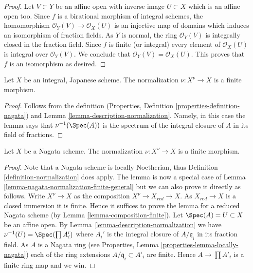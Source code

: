 \begin{proof}
Let $V \subset Y$ be an affine open
with inverse image $U \subset X$ which is an affine open too.
Since $f$ is a birational morphism of integral schemes, the homomorphism
$\mathcal{O}_Y(V) \to \mathcal{O}_X(U)$ is an injective map of domains
which induces an isomorphism of fraction fields. As $Y$ is normal,
the ring $\mathcal{O}_Y(V)$ is integrally closed in the fraction field.
Since $f$ is finite (or integral) every element of $\mathcal{O}_X(U)$
is integral over $\mathcal{O}_Y(V)$. We conclude that
$\mathcal{O}_Y(V) = \mathcal{O}_X(U)$. This proves that $f$ is an
isomorphism as desired.
\end{proof}

\begin{lemma}
\label{lemma-Japanese-normalization}
Let $X$ be an integral, Japanese scheme.
The normalization $\nu : X^\nu \to X$ is a finite morphism.
\end{lemma}

\begin{proof}
Follows from the definition
(Properties, Definition \ref{properties-definition-nagata}) and
Lemma \ref{lemma-description-normalization}. Namely, in this case
the lemma says that $\nu^{-1}(\Spec(A))$ is the spectrum
of the integral closure of $A$ in its field of fractions.
\end{proof}

\begin{lemma}
\label{lemma-nagata-normalization}
Let $X$ be a Nagata scheme.
The normalization $\nu : X^\nu \to X$ is a finite morphism.
\end{lemma}

\begin{proof}
Note that a Nagata scheme is locally Noetherian, thus
Definition \ref{definition-normalization}
does apply. The lemma is now a special case of
Lemma \ref{lemma-nagata-normalization-finite-general}
but we can also prove it directly as follows.
Write $X^\nu \to X$ as the composition
$X^\nu \to X_{red} \to X$. As $X_{red} \to X$ is a closed immersion
it is finite. Hence it suffices to prove the lemma for a reduced
Nagata scheme (by Lemma \ref{lemma-composition-finite}).
Let $\Spec(A) = U \subset X$ be an affine open.
By Lemma \ref{lemma-description-normalization} we have
$\nu^{-1}(U) = \Spec(\prod A_i')$ where $A_i'$ is the integral
closure of $A/\mathfrak q_i$ in its fraction field. As $A$ is a Nagata
ring (see Properties, Lemma \ref{properties-lemma-locally-nagata})
each of the ring extensions
$A/\mathfrak q_i \subset A'_i$ are finite. Hence $A \to \prod A'_i$
is a finite ring map and we win.
\end{proof}

